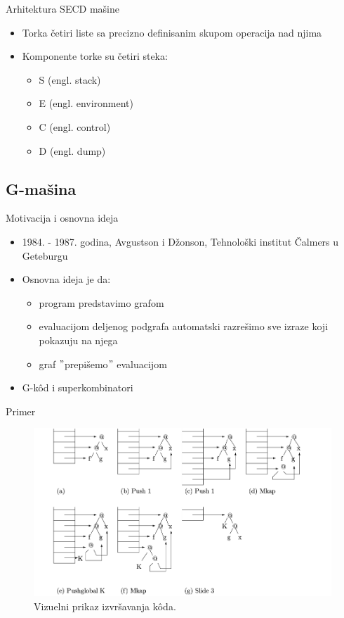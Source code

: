 \documentclass[xcolor={dvipsnames}, 11pt]{beamer}
\begin{document}
\begin{frame}{Arhitektura SECD mašine}
	\begin{itemize}
	\item Torka četiri liste sa precizno definisanim skupom operacija nad njima
	\item Komponente torke su četiri steka: 
		\begin{itemize}
		\item S (engl. stack)
		\item E (engl. environment)
		\item C (engl. control)
		\item D	(engl. dump)
		\end{itemize}
	\end{itemize}
	
\end{frame}

\subsection{G-mašina}
\begin{frame}{Motivacija i osnovna ideja}
	\begin{itemize}
		\item 1984. - 1987. godina, Avgustson i Džonson, Tehnološki institut Čalmers u Geteburgu
		\item Osnovna ideja je da: 
			\begin{itemize}
			\item program predstavimo grafom
			\item evaluacijom deljenog podgrafa automatski razrešimo sve izraze koji pokazuju na njega
			\item graf $"$prepišemo$"$ evaluacijom
			\end{itemize}
		\item G-k\^od i superkombinatori	
	\end{itemize}
\end{frame}

\begin{frame}{Primer}
	\begin{figure}[h!]
		\centering
		\includegraphics[scale=0.35]{primerGmasine.png}
		\caption{Vizuelni prikaz izvršavanja k\^ oda.}
		\label{fig:primerGmasine}
	\end{figure}

\end{frame}
\end{document}
